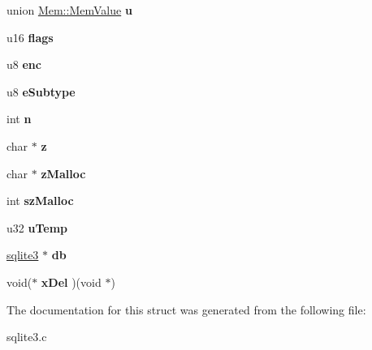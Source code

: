 \begin{DoxyCompactItemize}
\item 
union \hyperlink{unionMem_1_1MemValue}{Mem\+::\+Mem\+Value} {\bfseries u}\hypertarget{structMem_ac280628b51c0d03433ce3a05821b2911}{}\label{structMem_ac280628b51c0d03433ce3a05821b2911}

\item 
u16 {\bfseries flags}\hypertarget{structMem_a209bf3317161d1e33af9fe8b512f4974}{}\label{structMem_a209bf3317161d1e33af9fe8b512f4974}

\item 
u8 {\bfseries enc}\hypertarget{structMem_af437c99e92b8e729b70f82fa94e96bff}{}\label{structMem_af437c99e92b8e729b70f82fa94e96bff}

\item 
u8 {\bfseries e\+Subtype}\hypertarget{structMem_acb9ea95c050b4a96bd4c41386b05342a}{}\label{structMem_acb9ea95c050b4a96bd4c41386b05342a}

\item 
int {\bfseries n}\hypertarget{structMem_a5a613756e096c221ec68077c28424d84}{}\label{structMem_a5a613756e096c221ec68077c28424d84}

\item 
char $\ast$ {\bfseries z}\hypertarget{structMem_a85c51a0b445063ba913693517860f5ea}{}\label{structMem_a85c51a0b445063ba913693517860f5ea}

\item 
char $\ast$ {\bfseries z\+Malloc}\hypertarget{structMem_a68cd8f196d9dc8ab27845e1b4abbc95c}{}\label{structMem_a68cd8f196d9dc8ab27845e1b4abbc95c}

\item 
int {\bfseries sz\+Malloc}\hypertarget{structMem_a857df48ae7c5d3af4a8a8a3ed95bc873}{}\label{structMem_a857df48ae7c5d3af4a8a8a3ed95bc873}

\item 
u32 {\bfseries u\+Temp}\hypertarget{structMem_a36fce871381c6e796488034e41388a83}{}\label{structMem_a36fce871381c6e796488034e41388a83}

\item 
\hyperlink{structsqlite3}{sqlite3} $\ast$ {\bfseries db}\hypertarget{structMem_a478da33d1e83a23931b372f9ddc706f2}{}\label{structMem_a478da33d1e83a23931b372f9ddc706f2}

\item 
void($\ast$ {\bfseries x\+Del} )(void $\ast$)\hypertarget{structMem_a0d89e070132d482e8f3da755f0bb17bb}{}\label{structMem_a0d89e070132d482e8f3da755f0bb17bb}

\end{DoxyCompactItemize}


The documentation for this struct was generated from the following file\+:\begin{DoxyCompactItemize}
\item 
sqlite3.\+c\end{DoxyCompactItemize}
